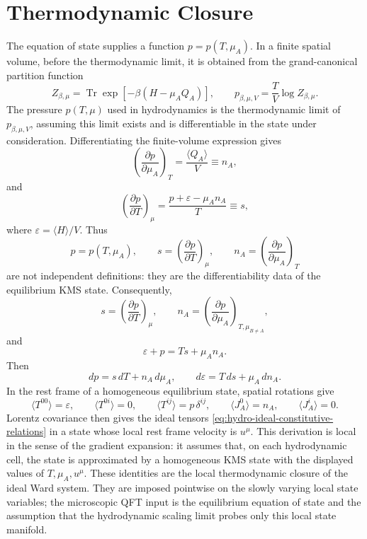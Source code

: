 \section{Thermodynamic Closure}

The equation of state supplies a function \(p=p(T,\mu_A)\).  In a finite
spatial volume, before the thermodynamic limit, it is obtained from the
grand-canonical partition function
\[
  Z_{\beta,\mu}
  =
  \operatorname{Tr}\exp[-\beta(H-\mu_AQ_A)],
  \qquad
  p_{\beta,\mu,V}
  =
  \frac{T}{V}\log Z_{\beta,\mu}.
\]
The pressure \(p(T,\mu)\) used in hydrodynamics is the thermodynamic limit
of \(p_{\beta,\mu,V}\), assuming this limit exists and is differentiable in
the state under consideration.  Differentiating the finite-volume expression
gives
\[
  \left(\frac{\partial p}{\partial\mu_A}\right)_T
  =
  \frac{\langle Q_A\rangle}{V}
  \equiv n_A,
\]
and
\[
  \left(\frac{\partial p}{\partial T}\right)_{\mu}
  =
  \frac{p+\varepsilon-\mu_A n_A}{T}
  \equiv s,
\]
where \(\varepsilon=\langle H\rangle/V\).  Thus
\[
  p=p(T,\mu_A),\qquad
  s=\left(\frac{\partial p}{\partial T}\right)_\mu,\qquad
  n_A=\left(\frac{\partial p}{\partial\mu_A}\right)_T
\]
are not independent definitions: they are the differentiability data of the
equilibrium KMS state.  Consequently,
\[
  s=\left(\frac{\partial p}{\partial T}\right)_{\mu},
  \qquad
  n_A=\left(\frac{\partial p}{\partial\mu_A}\right)_{T,\mu_{B\ne A}},
\]
and
\begin{equation}
  \varepsilon+p=Ts+\mu_A n_A.
  \label{eq:hydro-gibbs-duhem-energy}
\end{equation}
Then
\begin{equation}
  dp=s\,dT+n_A\,d\mu_A,
  \qquad
  d\varepsilon=T\,ds+\mu_A\,dn_A .
  \label{eq:hydro-thermodynamic-relations}
\end{equation}
In the rest frame of a homogeneous equilibrium state, spatial rotations give
\[
  \langle T^{00}\rangle=\varepsilon,\qquad
  \langle T^{0i}\rangle=0,\qquad
  \langle T^{ij}\rangle=p\,\delta^{ij},
  \qquad
  \langle J_A^0\rangle=n_A,\qquad
  \langle J_A^i\rangle=0.
\]
Lorentz covariance then gives the ideal tensors
\eqref{eq:hydro-ideal-constitutive-relations} in a state whose local rest
frame velocity is \(u^\mu\).  This derivation is local in the sense of the
gradient expansion: it assumes that, on each hydrodynamic cell, the state is
approximated by a homogeneous KMS state with the displayed values of
\(T,\mu_A,u^\mu\).
These identities are the local thermodynamic closure of the ideal Ward
system.  They are imposed pointwise on the slowly varying local state
variables; the microscopic QFT input is the equilibrium equation of state and
the assumption that the hydrodynamic scaling limit probes only this local
state manifold.

